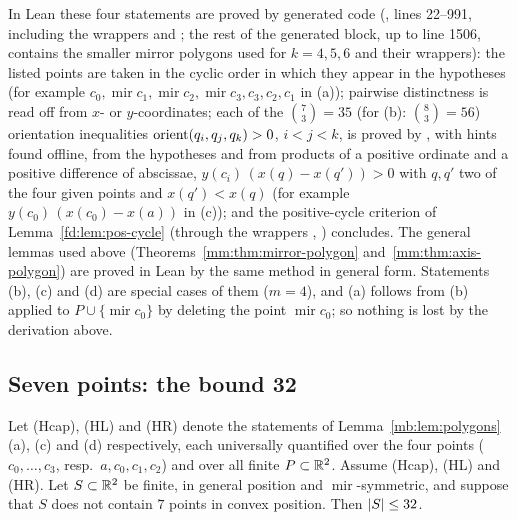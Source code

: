 \begin{remark}\label{mb:rem:generated}
In Lean these four statements are proved by generated code (, lines 22--991,
including the wrappers  and ; the rest of the generated block, up to line 1506, contains the
smaller mirror polygons used for $k=4,5,6$ and their wrappers): the listed points are taken in the cyclic order in which
they appear in the hypotheses
(for example $c_0,\operatorname{mir}c_1,\operatorname{mir}c_2,\operatorname{mir}c_3,c_3,c_2,c_1$ in (a)); pairwise
distinctness is read off from $x$- or $y$-coordinates; each of the $\binom73=35$ (for (b): $\binom83=56$) orientation
inequalities $\operatorname{orient}(q_i,q_j,q_k)>0$, $i<j<k$, is proved by , with hints found offline, from the
hypotheses and from products of a positive ordinate and a positive difference of abscissae, $y(c_i)\,(x(q)-x(q'))>0$
with $q,q'$ two of the four given points and $x(q')<x(q)$ (for example $y(c_0)\,(x(c_0)-x(a))$ in (c)); and the
positive-cycle criterion of Lemma~\ref{fd:lem:pos-cycle} (through the wrappers , ) concludes. The
general lemmas used above (Theorems~\ref{mm:thm:mirror-polygon} and~\ref{mm:thm:axis-polygon}) are proved in Lean by
the same method in general form. Statements (b), (c) and (d) are special cases of them ($m=4$), and (a) follows from (b)
applied to $P\cup\{\operatorname{mir}c_0\}$ by deleting the point $\operatorname{mir}c_0$; so nothing is lost by the
derivation above.
\end{remark}

\subsection{Seven points: the bound 32}\label{mb:ssec:seven}

\begin{lemma}[the reduction for $k=7$;\\
  \leanref{MirrorOdd.mirror_seven_of}{MIRRORETV/lean/MirrorMain.lean:1676}]\label{mb:lem:seven-of}
Let (Hcap), (HL) and (HR) denote the statements of Lemma~\ref{mb:lem:polygons}(a), (c) and (d) respectively, each
universally quantified over the four points ($c_0,\dots,c_3$, resp.\ $a,c_0,c_1,c_2$) and over all finite $P\subset\mathbb R^2$.
Assume (Hcap), (HL) and (HR). Let $S\subset\mathbb R^2$ be finite, in general position and $\operatorname{mir}$-symmetric, and
suppose that $S$ does not contain $7$ points in convex position. Then $\lvert S\rvert\le32$.
\end{lemma}

